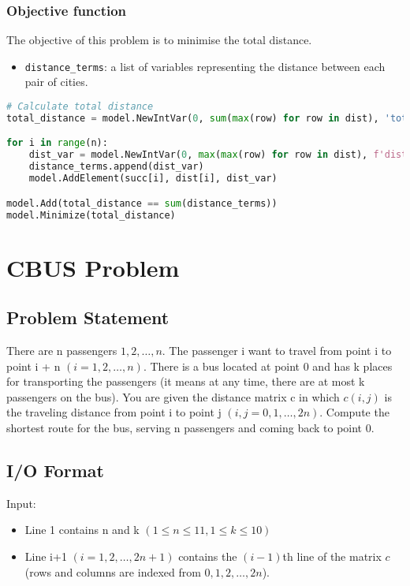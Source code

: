 \documentclass{article}
\begin{document}
\subsubsection{Objective function}
The objective of this problem is to minimise the total distance.
\begin{itemize}
    \item \verb|distance_terms|: a list of variables representing the distance between each pair of cities.
\end{itemize}
\begin{lstlisting}[language=Python]
# Calculate total distance
total_distance = model.NewIntVar(0, sum(max(row) for row in dist), 'total_distance')

for i in range(n):
    dist_var = model.NewIntVar(0, max(max(row) for row in dist), f'dist_{i}')
    distance_terms.append(dist_var)
    model.AddElement(succ[i], dist[i], dist_var)

model.Add(total_distance == sum(distance_terms))
model.Minimize(total_distance)
\end{lstlisting}
\pagebreak

\section{CBUS Problem}
\subsection{Problem Statement}
There are n passengers $1, 2, \dots, n$. 
The passenger i want to travel from point i to point i + n $(i = 1,2,\dots,n)$. 
There is a bus located at point 0 and has k places for transporting the passengers (it means at any 
time, there are at most k passengers on the bus). You are given the distance 
matrix c in which $c(i,j)$ is the traveling distance from point i to point j 
$(i, j = 0,1, \dots , 2n)$. Compute the shortest route for the bus, serving n passengers 
and coming back to point 0.

\subsection{I/O Format}
Input:
\begin{itemize}
    \item Line 1 contains n and k $(1\le n\le 11,1 \le k \le 10)$
    \item Line i+1 $(i=1,2,\dots,2n+1)$ contains the $(i - 1)$th
    line of the matrix $c$ (rows and columns are indexed from $0,1,2, \dots,2n$).
\end{itemize}
\end{document}
